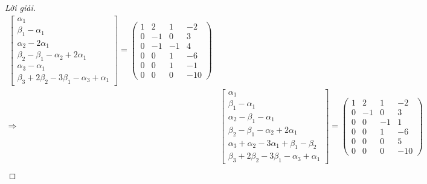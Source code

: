\begin{proof}[Lời giải]
\begin{align*}
        \begin{bmatrix}
            \alpha_{1}                                       \\
            \beta_{1} - \alpha_{1}                           \\
            \alpha_{2} - 2\alpha_{1}                         \\
            \beta_{2} - \beta_{1} - \alpha_{2} + 2\alpha_{1} \\
            \alpha_{3} - \alpha_{1}                          \\
            \beta_{3} + 2\beta_{2} - 3\beta_{1} - \alpha_{3} + \alpha_{1}
        \end{bmatrix}=
        \begin{pmatrix}
            1 & 2  & 1  & -2  \\
            0 & -1 & 0  & 3   \\
            0 & -1 & -1 & 4   \\
            0 & 0  & 1  & -6  \\
            0 & 0  & 1  & -1  \\
            0 & 0  & 0  & -10
        \end{pmatrix}                \\
        \Longrightarrow &
        \begin{bmatrix}
            \alpha_{1}                                                    \\
            \beta_{1} - \alpha_{1}                                        \\
            \alpha_{2} - \beta_{1} - \alpha_{1}                           \\
            \beta_{2} - \beta_{1} - \alpha_{2} + 2\alpha_{1}              \\
            \alpha_{3} + \alpha_{2} - 3\alpha_{1} + \beta_{1} - \beta_{2} \\
            \beta_{3} + 2\beta_{2} - 3\beta_{1} - \alpha_{3} + \alpha_{1}
        \end{bmatrix}=
        \begin{pmatrix}
            1 & 2  & 1  & -2  \\
            0 & -1 & 0  & 3   \\
            0 & 0  & -1 & 1   \\
            0 & 0  & 1  & -6  \\
            0 & 0  & 0  & 5   \\
            0 & 0  & 0  & -10
        \end{pmatrix}                \\

\end{align*}
\end{proof}
